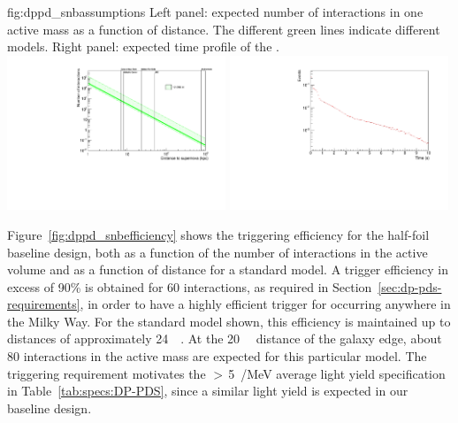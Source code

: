 \begin{dunefigure}{fig:dppd_snbassumptions}
     {Left panel: expected number of  \nue {} interactions in one \dpactivelarmass active mass  as a function of  distance. The different green lines indicate different  models. Right panel: expected time profile of the .}
    \includegraphics[width=0.49\textwidth]{graphics/dppd_events_vs_sndistance.pdf} \hfill
    \includegraphics[width=0.49\textwidth]{graphics/dppd_sntime_profile.pdf} 
    \end{dunefigure}

Figure~\ref{fig:dppd_snbefficiency} shows the  triggering efficiency for the half-foil baseline  design, both as a function of the number of  interactions in the active volume and as a function of  distance for a standard  model. A trigger efficiency in excess of \num{90}\% is obtained for \num{60}  interactions, as required in Section~\ref{sec:dp-pds-requirements}, in order to have a highly efficient trigger for  occurring anywhere in the Milky Way. For the standard  model shown, this efficiency is maintained up to  distances of approximately \SI{24}{\kilo\parsec}. At the \SI{20}{\kilo\parsec} distance of the galaxy edge, about \num{80}  interactions in the \dpactivelarmass active mass are expected for this particular  model. The  triggering requirement motivates the $>\,$\SI{5}{/\MeV} average light yield specification in Table~\ref{tab:specs:DP-PDS}, since a similar light yield is expected in our baseline design.

